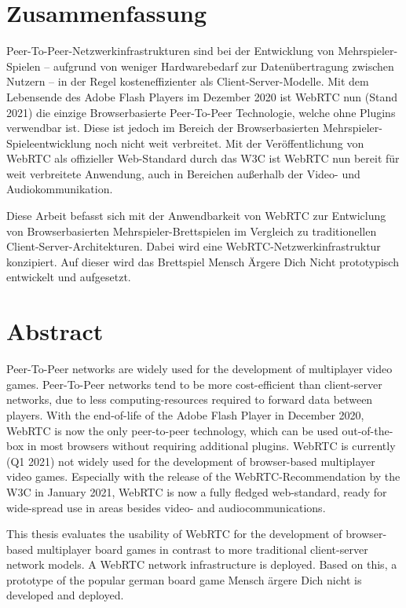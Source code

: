 \vspace{-55pt}
\begin{singlespace}
\chapter*{Zusammenfassung}

Peer-To-Peer-Netzwerkinfrastrukturen sind bei der Entwicklung von Mehrspieler-Spielen -- aufgrund von weniger Hardwarebedarf zur Datenübertragung zwischen Nutzern -- in der Regel kosteneffizienter als Client-Server-Modelle. Mit dem Lebensende des Adobe Flash Players im Dezember 2020 ist WebRTC nun (Stand 2021) die einzige Browserbasierte Peer-To-Peer Technologie, welche ohne Plugins verwendbar ist. Diese ist jedoch im Bereich der Browserbasierten Mehrspieler-Spieleentwicklung noch nicht weit verbreitet. Mit der Veröffentlichung von WebRTC als offizieller Web-Standard durch das W3C ist WebRTC nun bereit für weit verbreitete Anwendung, auch in Bereichen außerhalb der Video- und Audiokommunikation.\par

Diese Arbeit befasst sich mit der Anwendbarkeit von WebRTC zur Entwiclung von Browserbasierten Mehrspieler-Brettspielen  im Vergleich zu \glqq{}traditionellen\grqq{} Client-Server-Architekturen. Dabei wird eine WebRTC-Netzwerkinfrastruktur konzipiert. Auf dieser wird das Brettspiel \glqq{}Mensch Ärgere Dich Nicht\grqq{} prototypisch entwickelt und aufgesetzt.\par 

\let\clearpage\relax
\chapter*{Abstract}
Peer-To-Peer networks are widely used for the development of multiplayer video games. Peer-To-Peer networks tend to be more cost-efficient than client-server networks, due to less computing-resources required to forward data between players. With the end-of-life of the Adobe Flash Player in December 2020, WebRTC is now the only peer-to-peer technology, which can be used out-of-the-box in most browsers without requiring additional plugins. WebRTC is currently (Q1 2021) not widely used for the development of browser-based multiplayer video games. Especially with the release of the WebRTC-Recommendation by the W3C in January 2021, WebRTC is now a fully fledged web-standard, ready for wide-spread use in areas besides video- and audiocommunications.\par

This thesis evaluates the usability of WebRTC for the development of browser-based multiplayer board games in contrast to more \grqq{}traditional\grqq{} client-server network models. A WebRTC network infrastructure is deployed. Based on this, a prototype of the popular german board game \grqq{}Mensch ärgere Dich nicht\grqq{} is developed and deployed.\par
\end{singlespace}
